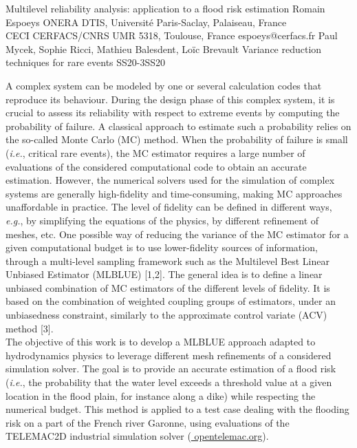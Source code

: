 \begin{talk}
  {Multilevel reliability analysis: application to a flood risk estimation}%
  {Romain Espoeys}%
  {ONERA DTIS, Université Paris-Saclay, Palaiseau, France \\
  CECI CERFACS/CNRS UMR 5318, Toulouse, France}
  {espoeys@cerfacs.fr}%
  {Paul Mycek, Sophie Ricci, Mathieu Balesdent, Loïc Brevault}%
{Variance reduction techniques for rare events}
{}{SS20-3}{SS20}


A complex system can be modeled by one or several calculation codes that reproduce its behaviour. During the design phase of this complex system, it is crucial to assess its reliability with respect to extreme events by computing the probability of failure. A classical approach to estimate such a probability relies on the so-called Monte Carlo (MC) method. When the probability of failure is small (\textit{i.e.}, critical rare events), the MC estimator requires a large number of evaluations of the considered computational code to obtain an accurate estimation. However, the numerical solvers used for the simulation of complex systems are generally high-fidelity and time-consuming, making MC approaches unaffordable in practice. The level of fidelity can be defined in different ways, \textit{e.g.}, by simplifying the equations of the physics, by different refinement of meshes, etc. One possible way of reducing the variance of the MC estimator for a given computational budget is to use lower-fidelity sources of information, through a multi-level sampling framework such as the Multilevel Best Linear Unbiased Estimator (MLBLUE) [1,2]. The general idea is to define a linear unbiased combination of MC estimators of the different levels of fidelity. It is based on the combination of weighted coupling groups of estimators, under an unbiasedness constraint, similarly to the approximate control variate (ACV) method [3]. \\
The objective of this work is to develop a MLBLUE approach adapted to hydrodynamics physics to leverage different mesh refinements of a considered simulation solver. The goal is to provide an accurate estimation of a flood risk (\textit{i.e.}, the probability that the water level exceeds a threshold value at a given location in the flood plain, for instance along a dike) while respecting the numerical budget. This method is applied to a test case dealing with the flooding risk on a part of the French river Garonne, using evaluations of the TELEMAC2D industrial simulation solver (\url{ opentelemac.org}).



\end{talk}
